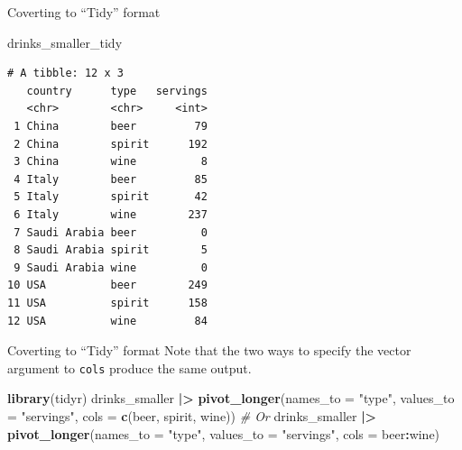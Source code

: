 \documentclass[
  ignorenonframetext,
]{beamer}
\newenvironment{Shaded}{\begin{snugshade}}{\end{snugshade}}
\newcommand{\AttributeTok}[1]{\textcolor[rgb]{0.13,0.29,0.53}{#1}}
\newcommand{\CommentTok}[1]{\textcolor[rgb]{0.56,0.35,0.01}{\textit{#1}}}
\newcommand{\FunctionTok}[1]{\textcolor[rgb]{0.13,0.29,0.53}{\textbf{#1}}}
\newcommand{\NormalTok}[1]{#1}
\newcommand{\SpecialCharTok}[1]{\textcolor[rgb]{0.81,0.36,0.00}{\textbf{#1}}}
\newcommand{\StringTok}[1]{\textcolor[rgb]{0.31,0.60,0.02}{#1}}
\begin{document}
\begin{frame}[fragile]{Coverting to ``Tidy'' format}
\protect\hypertarget{coverting-to-tidy-format-1}{}
\begin{Shaded}
\begin{Highlighting}[]
\NormalTok{drinks\_smaller\_tidy}
\end{Highlighting}
\end{Shaded}

\begin{verbatim}
# A tibble: 12 x 3
   country      type   servings
   <chr>        <chr>     <int>
 1 China        beer         79
 2 China        spirit      192
 3 China        wine          8
 4 Italy        beer         85
 5 Italy        spirit       42
 6 Italy        wine        237
 7 Saudi Arabia beer          0
 8 Saudi Arabia spirit        5
 9 Saudi Arabia wine          0
10 USA          beer        249
11 USA          spirit      158
12 USA          wine         84
\end{verbatim}
\end{frame}

\begin{frame}[fragile]{Coverting to ``Tidy'' format}
\protect\hypertarget{coverting-to-tidy-format-2}{}
Note that the two ways to specify the vector argument to \texttt{cols}
produce the same output.

\normalsize

\begin{Shaded}
\begin{Highlighting}[]
\FunctionTok{library}\NormalTok{(tidyr)}
\NormalTok{drinks\_smaller }\SpecialCharTok{|\textgreater{}} 
  \FunctionTok{pivot\_longer}\NormalTok{(}\AttributeTok{names\_to =} \StringTok{"type"}\NormalTok{, }
               \AttributeTok{values\_to =} \StringTok{"servings"}\NormalTok{, }
               \AttributeTok{cols =} \FunctionTok{c}\NormalTok{(beer, spirit, wine))}
\CommentTok{\# Or}
\NormalTok{drinks\_smaller }\SpecialCharTok{|\textgreater{}} 
  \FunctionTok{pivot\_longer}\NormalTok{(}\AttributeTok{names\_to =} \StringTok{"type"}\NormalTok{, }
               \AttributeTok{values\_to =} \StringTok{"servings"}\NormalTok{, }
               \AttributeTok{cols =}\NormalTok{ beer}\SpecialCharTok{:}\NormalTok{wine)}
\end{Highlighting}
\end{Shaded}

\normalsize
\end{frame}
\end{document}
